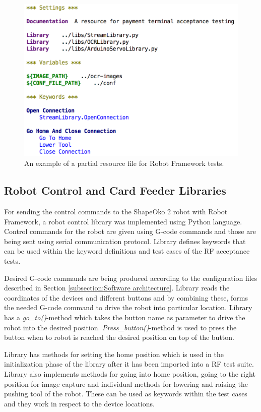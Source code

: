 \begin{figure}[ht]
  \begin{center}
    \includegraphics[width=12cm]{images/resource.png}
    \caption{An example of a partial resource file for Robot Framework tests.}
    \label{fig:resource}
  \end{center}
\end{figure}
\FloatBarrier

\subsection{Robot Control and Card Feeder Libraries}
\label{subsection:libraries}

For sending the control commands to the ShapeOko 2 robot with Robot Framework, a robot control library was implemented using Python language. Control commands for the robot are given using G-code commands and those are being sent using serial communication protocol. Library defines keywords that can be used within the keyword definitions and test cases of the RF acceptance tests.

Desired G-code commands are being produced according to the configuration files described in Section \ref{subsection:Software architecture}. Library reads the coordinates of the devices and different buttons and by combining these, forms the needed G-code command to drive the robot into particular location. Library has a \emph{go\_to()}-method which takes the button name as parameter to drive the robot into the desired position. \emph{Press\_button()}-method is used to press the button when to robot is reached the desired position on top of the button.

Library has methods for setting the home position which is used in the initialization phase of the library after it has been imported into a RF test suite. Library also implements methods for going into home position, going to the right position for image capture and individual methods for lowering and raising the pushing tool of the robot. These can be used as keywords within the test cases and they work in respect to the device locations.

